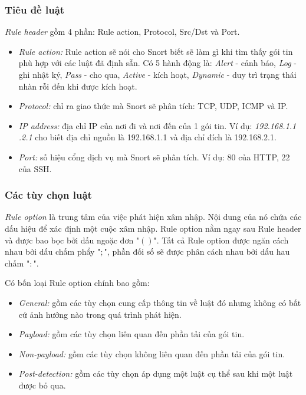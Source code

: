 \subsubsection{Tiêu đề luật}
\emph{Rule header} gồm 4 phần: Rule action, Protocol, Src/Dst và Port.

\begin{itemize}
\item \emph{Rule action:} Rule action sẽ nói cho Snort biết sẽ làm gì khi tìm thấy gói tin phù hợp với các luật đã định sẵn. Có 5 hành động là: \emph{Alert} - cảnh báo, \emph{Log} - ghi nhật ký, \emph{Pass} - cho qua, \emph{Active} - kích hoạt, \emph{Dynamic} - duy trì trạng thái nhàn rỗi đến khi được kích hoạt.
\item \emph{Protocol:} chỉ ra giao thức mà Snort sẽ phân tích: TCP, UDP, ICMP và IP.
\item \emph{IP address:} địa chỉ IP của nơi đi và nơi đến của 1 gói tin. Ví dụ: \emph{192.168.1.1 .2.1} cho biết địa chỉ nguồn là 192.168.1.1 và địa chỉ đích là 192.168.2.1.
\item \emph{Port:} số hiệu cổng dịch vụ mà Snort sẽ phân tích. Ví dụ: 80 của HTTP, 22 của SSH.
\end{itemize}

\subsubsection{Các tùy chọn luật}
\emph{Rule option} là trung tâm của việc phát hiện xâm nhập. Nội dung của nó chứa các dấu hiệu để xác định một cuộc xâm nhập. Rule option nằm ngay sau Rule header và được bao bọc bởi dấu ngoặc đơn "\(()\)". Tất cả Rule option được ngăn cách nhau bởi dấu chấm phẩy "\(;\)", phần đối số sẽ được phân cách nhau bởi dấu hau chấm "\(:\)".

Có bốn loại Rule option chính bao gồm:
\begin{itemize}
\item \emph{General:} gồm các tùy chọn cung cấp thông tin về luật đó nhưng không có bất cứ ảnh hưởng nào trong quá trình phát hiện.
\item \emph{Payload:} gồm các tùy chọn liên quan đến phần tải của gói tin.
\item \emph{Non-payload:} gồm các tùy chọn không liên quan đến phần tải của gói tin.
\item \emph{Post-detection:} gồm các tùy chọn áp dụng một luật cụ thể sau khi một luật được bỏ qua.
\end{itemize}

